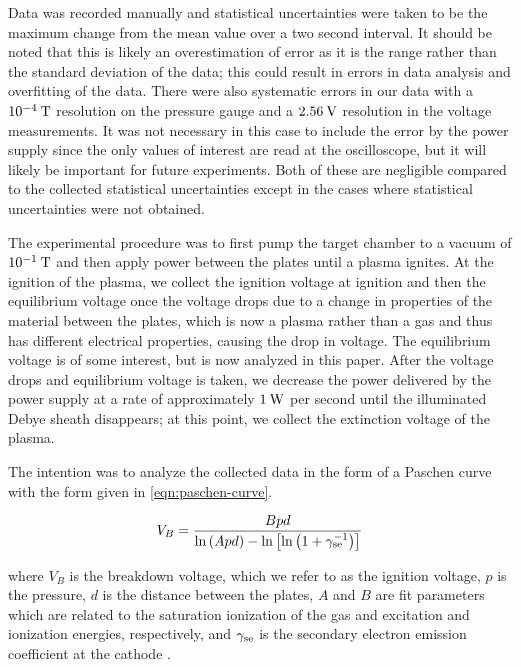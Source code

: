 \documentclass[reprint]{revtex4-1}
\begin{document}
Data was recorded manually and statistical uncertainties were taken to be the maximum change from the mean value over a two second interval. It should be noted that this is likely an overestimation of error as it is the range rather than the standard deviation of the data; this could result in errors in data analysis and overfitting of the data. There were also systematic errors in our data with a $10^{-4}\:\rm{T}$ resolution on the pressure gauge and a $2.56\:\rm{V}$ resolution in the voltage measurements. It was not necessary in this case to include the error by the power supply since the only values of interest are read at the oscilloscope, but it will likely be important for future experiments. Both of these are negligible compared to the collected statistical uncertainties except in the cases where statistical uncertainties were not obtained.

The experimental procedure was to first pump the target chamber to a vacuum of $10^{-1}\:\rm{T}$ and then apply power between the plates until a plasma ignites. At the ignition of the plasma, we collect the ignition voltage at ignition and then the equilibrium voltage once the voltage drops due to a change in properties of the material between the plates, which is now a plasma rather than a gas and thus has different electrical properties, causing the drop in voltage. The equilibrium voltage is of some interest, but is now analyzed in this paper. After the voltage drops and equilibrium voltage is taken, we decrease the power delivered by the power supply at a rate of approximately $1\:\rm{W}$ per second until the illuminated Debye sheath disappears; at this point, we collect the extinction voltage of the plasma.

The intention was to analyze the collected data in the form of a Paschen curve with the form given in \cref{eqn:paschen-curve}.

\begin{equation}
V_B = \frac{B p d}{\ln{\left( A p d \right)} - \ln{\left[ \ln{\left( 1 + \gamma_{\rm{se}}^{-1} \right)} \right]}}
\label{eqn:paschen-curve}
\end{equation}

where $V_B$ is the breakdown voltage, which we refer to as the ignition voltage, $p$ is the pressure, $d$ is the distance between the plates, $A$ and $B$ are fit parameters which are related to the saturation ionization of the gas and excitation and ionization energies, respectively, and $\gamma_{\rm{se}}$ is the secondary electron emission coefficient at the cathode \cite{Lieberman2005}.
\end{document}

